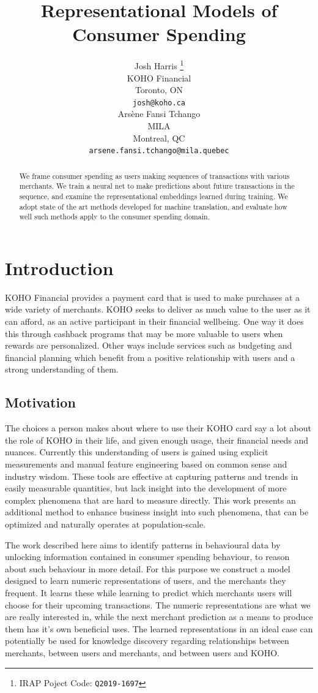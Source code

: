 \documentclass{article}
\title{Representational Models of Consumer Spending}
\author{%
  Josh Harris \thanks{IRAP Poject Code: \texttt{Q2019-1697}}\\
  KOHO Financial\\
  Toronto, ON \\
  \texttt{josh@koho.ca} \\
  
  \And
  Ars\`{e}ne Fansi Tchango \\
  MILA \\
  Montreal, QC \\
  \texttt{arsene.fansi.tchango@mila.quebec}
}
\begin{document}
\maketitle

\thispagestyle{disclaimer-footer}

\begin{abstract}
  We frame consumer spending as users making sequences of transactions with various merchants. We train a neural net to make predictions about future transactions in the sequence, and examine the representational embeddings learned during training. We adopt state of the art methods developed for machine translation, and evaluate how well such methods apply to the consumer spending domain.
\end{abstract}

\section{Introduction}
KOHO Financial provides a payment card that is used to make purchases at a wide variety of merchants. KOHO seeks to deliver as much value to the user as it can afford, as an active participant in their financial wellbeing. One way it does this through cashback programs that may be more valuable to users when rewards are personalized. Other ways include services such as budgeting and financial planning which benefit from a positive relationship with users and a strong understanding of them.

\subsection{Motivation}
The choices a person makes about where to use their KOHO card say a lot about the role of KOHO in their life, and given enough usage, their financial needs and nuances. Currently this understanding of users is gained using explicit measurements and manual feature engineering based on common sense and industry wisdom. These tools are effective at capturing patterns and trends in easily measurable quantities, but lack insight into the development of more complex phenomena that are hard to measure directly. This work presents an additional method to enhance business insight into such phenomena, that can be optimized and naturally operates at population-scale.

The work described here aims to identify patterns in behavioural data by unlocking information contained in consumer spending behaviour, to reason about such behaviour in more detail. For this purpose we construct a model designed to learn numeric representations of users, and the merchants they frequent. It learns these while learning to predict which merchants users will choose for their upcoming transactions. The numeric representations are what we are really interested in, while the next merchant prediction as a means to produce them has it's own beneficial uses. The learned representations in an ideal case can potentially be used for knowledge discovery regarding relationships between merchants, between users and merchants, and between users and KOHO. 
\end{document}
